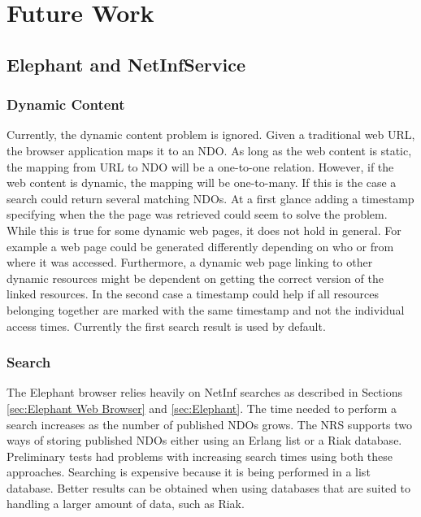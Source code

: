\section{Future Work}

\subsection{Elephant and NetInfService}

\subsubsection{Dynamic Content}

Currently, the dynamic content problem is ignored. Given a traditional web URL, the browser application maps 
it to an NDO. As long as the web content is static, the mapping from URL to NDO will be a one-to-one relation. 
However, if the web content is dynamic, the mapping will be one-to-many. If this is the case a search could return 
several matching NDOs. At a first glance adding a timestamp specifying when the the page was retrieved could seem 
to solve the problem. %
While this is true for some dynamic web pages, it does not hold in general. For example a web 
page could be generated differently depending on who or from where it was accessed. Furthermore, a dynamic web page 
linking to other dynamic resources might be dependent on getting the correct version of the linked resources. In the 
second case a timestamp could help if all resources belonging together are marked with the same timestamp and not the 
individual access times. Currently the first search result is used by default.

\subsubsection{Search}

The Elephant browser relies heavily on NetInf searches as described in Sections \ref{sec:Elephant Web Browser} 
and \ref{sec:Elephant}. The time needed to perform a search increases as the number of published 
NDOs grows. The NRS supports two ways of storing published NDOs either using an Erlang list or a Riak database. 
Preliminary tests had problems with increasing search times using both these approaches. Searching is expensive because it
is being performed in a list database. Better results can be obtained when using databases that are suited to handling a
larger amount of data, such as Riak.

